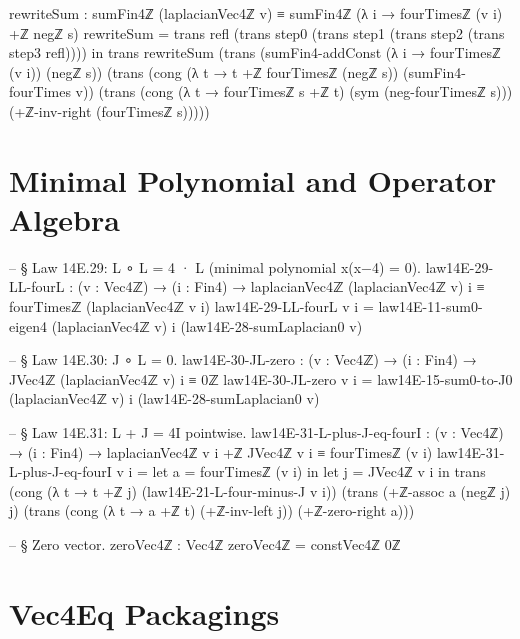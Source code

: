 \documentclass[11pt,a4paper]{book}
\begin{document}
\begin{code}
    rewriteSum :
      sumFin4ℤ (laplacianVec4ℤ v) ≡
      sumFin4ℤ (λ i → fourTimesℤ (v i) +ℤ negℤ s)
    rewriteSum =
      trans
        refl
        (trans step0 (trans step1 (trans step2 (trans step3 refl))))
  in
  trans
    rewriteSum
    (trans
      (sumFin4-addConst (λ i → fourTimesℤ (v i)) (negℤ s))
      (trans
        (cong (λ t → t +ℤ fourTimesℤ (negℤ s)) (sumFin4-fourTimes v))
        (trans
          (cong (λ t → fourTimesℤ s +ℤ t) (sym (neg-fourTimesℤ s)))
          (+ℤ-inv-right (fourTimesℤ s)))))
\end{code}

\section{Minimal Polynomial and Operator Algebra}

\begin{code}
-- § Law 14E.29: L ∘ L = 4 · L (minimal polynomial x(x−4) = 0).
law14E-29-LL-fourL : (v : Vec4ℤ) → (i : Fin4) →
  laplacianVec4ℤ (laplacianVec4ℤ v) i ≡ fourTimesℤ (laplacianVec4ℤ v i)
law14E-29-LL-fourL v i =
  law14E-11-sum0-eigen4 (laplacianVec4ℤ v) i (law14E-28-sumLaplacian0 v)

-- § Law 14E.30: J ∘ L = 0.
law14E-30-JL-zero : (v : Vec4ℤ) → (i : Fin4) →
  JVec4ℤ (laplacianVec4ℤ v) i ≡ 0ℤ
law14E-30-JL-zero v i =
  law14E-15-sum0-to-J0 (laplacianVec4ℤ v) i (law14E-28-sumLaplacian0 v)

-- § Law 14E.31: L + J = 4I pointwise.
law14E-31-L-plus-J-eq-fourI : (v : Vec4ℤ) → (i : Fin4) →
  laplacianVec4ℤ v i +ℤ JVec4ℤ v i ≡ fourTimesℤ (v i)
law14E-31-L-plus-J-eq-fourI v i =
  let a = fourTimesℤ (v i) in
  let j = JVec4ℤ v i in
  trans
    (cong (λ t → t +ℤ j) (law14E-21-L-four-minus-J v i))
    (trans
      (+ℤ-assoc a (negℤ j) j)
      (trans
        (cong (λ t → a +ℤ t) (+ℤ-inv-left j))
        (+ℤ-zero-right a)))

-- § Zero vector.
zeroVec4ℤ : Vec4ℤ
zeroVec4ℤ = constVec4ℤ 0ℤ
\end{code}

\section{Vec4Eq Packagings}
\end{document}
